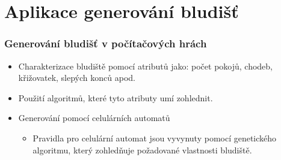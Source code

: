 \documentclass{beamer}
\begin{document}
\section{Aplikace generování bludišť}
\begin{frame}
  \frametitle{Generování bludišť v počítačových hrách}
  \begin{itemize}
   \setlength\itemsep{2em}
   \item Charakterizace bludiště pomocí atributů jako: počet pokojů, chodeb, křižovatek, slepých konců apod.
   \item Použití algoritmů, které tyto atributy umí zohlednit.
   \item Generování pomocí celulárních automatů
   \begin{itemize}
    \item Pravidla pro celulární automat jsou vyvynuty pomocí genetického algoritmu, který zohledňuje požadované vlastnosti bludiště.
   \end{itemize}
  \end{itemize}
\end{frame}
\end{document}
